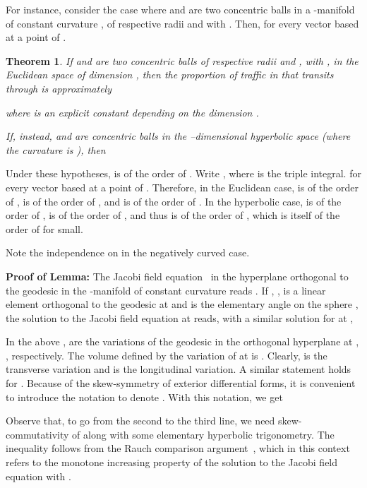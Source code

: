 \documentclass{article}
\newtheorem{theorem}{Theorem}
\newenvironment{proof}
{\noindent {\bf Proof.}}
{}
\begin{document}
For instance, consider the case where  and  are two concentric balls in a -manifold of constant curvature , of respective radii  and  with . 
Then,  for every vector  based at a point of . 


\begin{theorem}
If  and  are two concentric balls of respective radii  and , with  , in the Euclidean space of dimension , then the proportion  of traffic in  that transits through  is approximately

where  is an explicit constant depending on the dimension . 

If, instead,  and  are concentric balls in the --dimensional  hyperbolic space (where the curvature is ), then


\end{theorem}

\begin{proof}
Under these hypotheses, 
 is of the order of .
Write , where  is the triple integral. 
 for every vector  based at a point of . 
Therefore, in the Euclidean case,  is of the order of ,  
 is of the order of , and  is of the order of . 
In the hyperbolic case,  is of the order of , 
 is of the order of , 
and thus  is of the order of ,  
which is itself of the order of  for  small. 
\end{proof}

Note the independence on  in the negatively curved case.  


\noindent\textbf{Proof of Lemma:}
The Jacobi field equation~\cite{docarmo} in the hyperplane orthogonal to the geodesic  
in the -manifold  of constant curvature  reads . 
If , , is a linear element orthogonal to the geodesic at  
and  is the elementary angle on the sphere , 
the solution to the Jacobi field equation at  reads, with a similar solution for  at , 

In the above ,  are the variations of the geodesic in the orthogonal hyperplane at , , respectively.
The volume defined by the variation of  at  is  .   
Clearly,  is the transverse variation and  is the longitudinal variation.  
A similar statement holds for .
Because of the skew-symmetry of exterior differential forms, it is convenient to introduce the notation 
 to denote . 
With this notation, we get

Observe that, to go from the second to the third line, we need skew-commutativity of  along with some elementary hyperbolic trigonometry. 
The inequality follows from the Rauch comparison argument~\cite[VIII, Th. 4.1]{KobayashiNomizu1996b}, 
which in this context refers to the monotone increasing property of the solution  
to the Jacobi field equation with .
\end{document}
